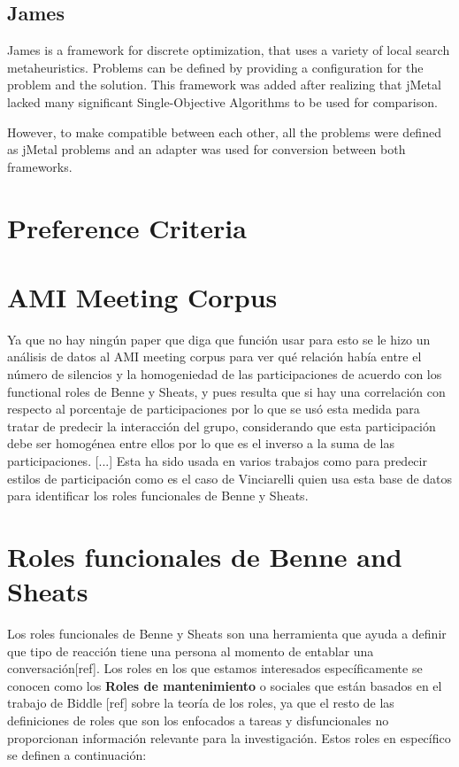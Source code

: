 \subsection{James}
James is a framework for discrete optimization, that uses a variety of local search metaheuristics. Problems can be defined by providing a configuration for the problem and the solution. This framework was added after realizing that jMetal lacked many significant Single-Objective Algorithms to be used for comparison. 

However, to make compatible between each other, all the problems were defined as jMetal problems and an adapter was used for conversion between both frameworks.



\section{Preference Criteria}


\section{AMI Meeting Corpus}

Ya que no hay ningún paper que diga que función usar para esto se le hizo un análisis de datos al AMI meeting corpus para ver qué relación había entre el número de silencios y la homogeniedad de las participaciones de acuerdo con los functional roles de Benne y Sheats, y pues resulta que si hay una correlación con respecto al porcentaje de participaciones por lo que se usó esta medida para tratar de predecir la interacción del grupo, considerando que esta participación debe ser homogénea entre ellos por lo que es el inverso a la suma de las participaciones.
[...]
Esta ha sido usada en varios trabajos como para predecir estilos de participación como es el caso de Vinciarelli\cite{VinciarelliUnderstandingCorpus} quien usa esta base de datos para identificar los roles funcionales de Benne y Sheats\cite{benne_sheats}. 

\section{Roles funcionales de Benne and Sheats }
Los roles funcionales de Benne y Sheats son una herramienta que ayuda a definir que tipo de reacción tiene una persona al momento de entablar una conversación[ref]. Los roles en los que estamos interesados específicamente se conocen como los \textbf{Roles de mantenimiento} o sociales que están basados en el trabajo de Biddle [ref] sobre la teoría de los roles, ya que el resto de las definiciones de roles que son los enfocados a tareas y disfuncionales no proporcionan información relevante para la investigación. Estos roles en específico se definen a continuación:

